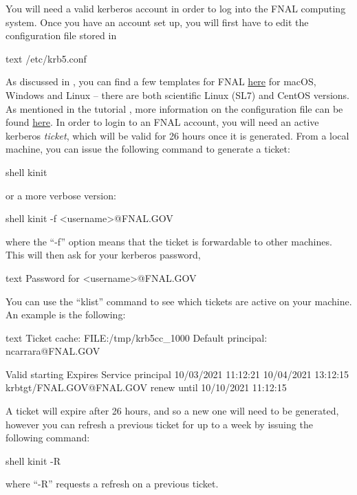\documentclass[8pt]{refart}
\begin{document}
\label{kerberos}
You will need a valid kerberos account \cite{kerberos} in order to log into the FNAL computing system.  Once you have an account set up, you will first have to edit the configuration file stored in
\begin{code}{text}
/etc/krb5.conf
\end{code}
As discussed in \cite{DUNEComputing2021}, you can find a few templates for FNAL \href{https://authentication.fnal.gov/krb5conf/}{here} for macOS, Windows and Linux -- there are both scientific Linux (SL7) and CentOS versions.  As mentioned in the tutorial \cite{DUNEComputing2021}, more information on the configuration file can be found \href{https://fermi.servicenowservices.com/kb_view.do?sysparm_article=KB0011315}{here}.  In order to login to an FNAL account, you will need an active kerberos \textit{ticket}, which will be valid for 26 hours once it is generated.  From a local machine, you can issue the following command to generate a ticket:
\begin{code}{shell}
kinit
\end{code}
or a more verbose version:
\begin{code}{shell}
kinit -f <username>@FNAL.GOV
\end{code}
where the ``-f'' option means that the ticket is forwardable to other machines.  This will then ask for your kerberos password,
\begin{code}{text}
Password for <username>@FNAL.GOV
\end{code}
You can use the ``klist'' command to see which tickets are active on your machine.  An example is the following:
\begin{code}{text}
Ticket cache: FILE:/tmp/krb5cc_1000
Default principal: ncarrara@FNAL.GOV

Valid starting       Expires              Service principal
10/03/2021 11:12:21  10/04/2021 13:12:15  krbtgt/FNAL.GOV@FNAL.GOV
	renew until 10/10/2021 11:12:15
\end{code}
A ticket will expire after 26 hours, and so a new one will need to be generated, however you can refresh a previous ticket for up to a week by issuing the following command:
\begin{code}{shell}
kinit -R
\end{code}
where ``-R'' requests a refresh on a previous ticket.
\end{document}
